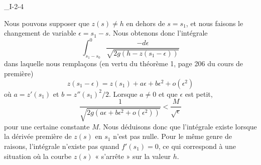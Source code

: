 \begin{corrige}{_I-2-4}

Nous pouvons supposer que $z(s)\neq h$ en dehors de $s=s_1$, et nous faisons le changement de variable $\epsilon=s_1-s$. Nous obtenons donc l'intégrale
\begin{equation}
	\int_{s_1-s_0}^0\frac{ -d\epsilon }{ \sqrt{ 2g(h-z(s_1-\epsilon)) } }
\end{equation}
dans laquelle nous remplaçons (en vertu du théorème 1, page 206 du cours de première)
\begin{equation}
	z(s_1-\epsilon)=z(s_1)+a\epsilon+b\epsilon^2+o(\epsilon^2)
\end{equation}
où $a=z'(s_1)$ et $b=z''(s_1)^2/2$. Lorsque $a\neq 0$ et que $\epsilon$ est petit,
\begin{equation}
	\frac{1}{ \sqrt{ 2g( a\epsilon+b\epsilon^2+o(\epsilon^2)  ) } }<\frac{ M }{ \sqrt{\epsilon} }
\end{equation}
pour une certaine constante $M$. Nous déduisons donc que l'intégrale existe lorsque la dérivée première de $z(s)$ en $s_1$ n'est pas nulle. Pour le même genre de raisons, l'intégrale n'existe pas quand $f'(s_1)=0$, ce qui correspond à une situation où la courbe $z(s)$ « s'arrête » sur la valeur $h$.


\end{corrige}


